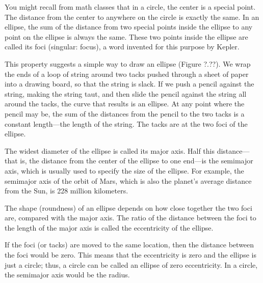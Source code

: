 \documentclass[../../main-astronomy.tex]{subfiles}
\begin{document}
\vspace{1em} %

You might recall from math classes that in a circle, the center is a special point. The distance from the center to anywhere on the circle is exactly the same. In an ellipse, the sum of the distance from two special points inside the ellipse to any point on the ellipse is always the same. These two points inside the ellipse are called its foci (singular: \gls{focus}), a word invented for this purpose by Kepler.

\vspace{1em}

This property suggests a simple way to draw an ellipse (Figure ?.??). We wrap the ends of a loop of string around two tacks pushed through a sheet of paper into a drawing board, so that the string is slack. If we push a pencil against the string, making the string taut, and then slide the pencil against the string all around the tacks, the curve that results is an ellipse. At any point where the pencil may be, the sum of the distances from the pencil to the two tacks is a constant length---the length of the string. The tacks are at the two foci of the ellipse.

\vspace{1em}

The widest diameter of the ellipse is called its \gls{major axis}. Half this distance---that is, the distance from the center of the ellipse to one end---is the \gls{semimajor axis}, which is usually used to specify the size of the ellipse. For example, the semimajor axis of the orbit of Mars, which is also the planet's average distance from the Sun, is 228 million kilometers.

\vspace{1em}

The shape (roundness) of an ellipse depends on how close together the two foci are, compared with the major axis. The ratio of the distance between the foci to the length of the major axis is called the \gls{eccentricity} of the ellipse.

\vspace{1em}

If the foci (or tacks) are moved to the same location, then the distance between the foci would be zero. This means that the eccentricity is zero and the ellipse is just a circle; thus, a circle can be called an ellipse of zero eccentricity. In a circle, the semimajor axis would be the radius.

\vspace{1em}
\end{document}
